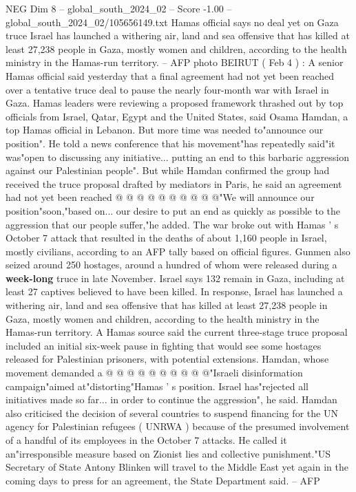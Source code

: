 \begin{textsample}{NEG Dim 8 – global\_south\_2024\_02 – Score -1.00 – global\_south\_2024\_02/105656149.txt}  \label{ex:f8_neg_067}
Hamas official says no deal yet on Gaza truce Israel has launched a withering air, land and sea offensive that has killed at least 27,238 people in Gaza, mostly women and children, according to the health ministry in the Hamas-run territory. -- AFP photo BEIRUT ( Feb 4 ) : A senior Hamas official said yesterday that a final agreement had not yet been reached over a tentative truce deal to pause the nearly four-month war with Israel in Gaza.
Hamas leaders were reviewing a proposed framework thrashed out by top officials from Israel, Qatar, Egypt and the United States, said Osama Hamdan, a top Hamas official in Lebanon.
But more time was needed to"announce our position".
He told a news conference that his movement"has repeatedly said"it was"open to discussing any initiative... putting an end to this barbaric aggression against our Palestinian people".
But while Hamdan confirmed the group had received the truce proposal drafted by mediators in Paris, he said an agreement had not yet been reached @ @ @ @ @ @ @ @ @ @"We will announce our position"soon,"based on... our desire to put an end as quickly as possible to the aggression that our people suffer,"he added.
The war broke out with Hamas ' s October 7 attack that resulted in the deaths of about 1,160 people in Israel, mostly civilians, according to an AFP tally based on official figures.
Gunmen also seized around 250 hostages, around a hundred of whom were released during a \textbf{week-long} truce in late November.
Israel says 132 remain in Gaza, including at least 27 captives believed to have been killed.
In response, Israel has launched a withering air, land and sea offensive that has killed at least 27,238 people in Gaza, mostly women and children, according to the health ministry in the Hamas-run territory.
A Hamas source said the current three-stage truce proposal included an initial six-week pause in fighting that would see some hostages released for Palestinian prisoners, with potential extensions.
Hamdan, whose movement demanded a @ @ @ @ @ @ @ @ @ @"Israeli disinformation campaign"aimed at"distorting"Hamas ' s position.
Israel has"rejected all initiatives made so far... in order to continue the aggression", he said.
Hamdan also criticised the decision of several countries to suspend financing for the UN agency for Palestinian refugees ( UNRWA ) because of the presumed involvement of a handful of its employees in the October 7 attacks.
He called it an"irresponsible measure based on Zionist lies and collective punishment."US Secretary of State Antony Blinken will travel to the Middle East yet again in the coming days to press for an agreement, the State Department said. -- AFP

\end{textsample}

